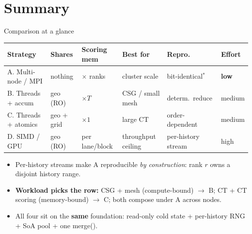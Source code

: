 \documentclass[aspectratio=169,10pt]{beamer}
\newcommand{\code}[1]{{\ttfamily\footnotesize #1}}
\begin{document}
\section{Summary}
\begin{frame}{Comparison at a glance}
  \centering
  \renewcommand{\arraystretch}{1.3}
  \footnotesize
  \begin{tabular}{l l l l l l}
    \textbf{Strategy} & \textbf{Shares} & \textbf{Scoring mem} & \textbf{Best for} & \textbf{Repro.} & \textbf{Effort}\\
    \hline
    \textcolor{oshGreen}{A. Multi-node / MPI} & nothing & $\times$ ranks & cluster scale & bit-identical$^\ast$ & \textbf{low}\\
    \textcolor{oshSky}{B. Threads + accum} & geo (RO) & $\times T$ & CSG / small mesh & determ.\ reduce & medium\\
    \textcolor{oshAmber}{C. Threads + atomics} & geo + grid & $\times 1$ & large CT & order-dependent & medium\\
    \textcolor{oshRed}{D. SIMD / GPU} & geo (RO) & per lane/block & throughput ceiling & per-history stream & high\\
  \end{tabular}
  \vspace{3mm}
  \begin{itemize}\scriptsize
    \item[$\ast$] Per-history streams make A reproducible \emph{by construction}: rank $r$ owns a disjoint history range.
    \item \textbf{Workload picks the row:} CSG + mesh (compute-bound) $\to$ B;
          CT + CT scoring (memory-bound) $\to$ C; both compose under A across nodes.
    \item All four sit on the \textbf{same} foundation: read-only cold state +
          per-history RNG + SoA pool + one \code{merge()}.
  \end{itemize}
\end{frame}
\end{document}
